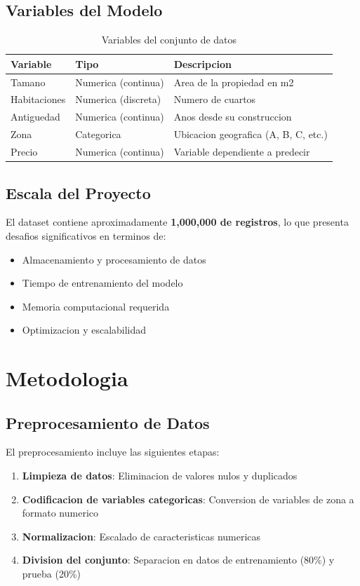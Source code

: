 \documentclass[12pt,a4paper]{article}
\begin{document}
\subsection{Variables del Modelo}
\begin{table}[H]
\centering
\begin{tabular}{|l|l|l|}
\hline
\textbf{Variable} & \textbf{Tipo} & \textbf{Descripcion} \\
\hline
Tamano & Numerica (continua) & Area de la propiedad en m2 \\
Habitaciones & Numerica (discreta) & Numero de cuartos \\
Antiguedad & Numerica (continua) & Anos desde su construccion \\
Zona & Categorica & Ubicacion geografica (A, B, C, etc.) \\
Precio & Numerica (continua) & Variable dependiente a predecir \\
\hline
\end{tabular}
\caption{Variables del conjunto de datos}
\end{table}

\subsection{Escala del Proyecto}
El dataset contiene aproximadamente \textbf{1,000,000 de registros}, lo que presenta desafios significativos en terminos de:
\begin{itemize}
    \item Almacenamiento y procesamiento de datos
    \item Tiempo de entrenamiento del modelo
    \item Memoria computacional requerida
    \item Optimizacion y escalabilidad
\end{itemize}

\section{Metodologia}

\subsection{Preprocesamiento de Datos}
El preprocesamiento incluye las siguientes etapas:

\begin{enumerate}
    \item \textbf{Limpieza de datos}: Eliminacion de valores nulos y duplicados
    \item \textbf{Codificacion de variables categoricas}: Conversion de variables de zona a formato numerico
    \item \textbf{Normalizacion}: Escalado de caracteristicas numericas
    \item \textbf{Division del conjunto}: Separacion en datos de entrenamiento (80\%) y prueba (20\%)
\end{enumerate}
\end{document}
